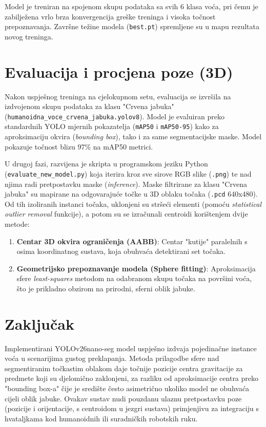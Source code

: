 \documentclass[12pt,a4paper]{article}
\begin{document}
Model je treniran na spojenom skupu podataka sa svih 6 klasa voća, pri čemu je zabilježena vrlo brza konvergencija greške treninga i visoka točnost prepoznavanja. Završne težine modela (\texttt{best.pt}) spremljene su u mapu rezultata novog treninga.

\section{Evaluacija i procjena poze (3D)}
Nakon uspješnog treninga na cjelokupnom setu, evaluacija se izvršila na izdvojenom skupu podataka za klasu "Crvena jabuka" (\texttt{humanoidna\_voce\_crvena\_jabuka.yolov8}).
Model je evaluiran preko standardnih YOLO mjernih pokazatelja (\texttt{mAP50} i \texttt{mAP50-95}) kako za aproksimaciju okvira (\textit{bounding box}), tako i za same segmentacijske maske. Model pokazuje točnost blizu 97\% na mAP50 metrici.

U drugoj fazi, razvijena je skripta u programskom jeziku Python (\texttt{evaluate\_new\_model.py}) koja iterira kroz sve sirove RGB slike (\texttt{.png}) te nad njima radi pretpostavku maske (\textit{inference}). Maske filtrirane za klasu "Crvena jabuka" su mapirane na odgovarajuće točke u 3D oblaku točaka (\texttt{.pcd} 640x480).
Od tih izoliranih instanci točaka, uklonjeni su stršeći elementi (pomoću \textit{statistical outlier removal} funkcije), a potom su se izračunali centroidi korištenjem dvije metode:
\begin{enumerate}
    \item \textbf{Centar 3D okvira ograničenja (AABB)}: Centar "kutije" paralelnih s osima koordinatnog sustava, koja obuhvaća detektirani set točaka.
    \item \textbf{Geometrijsko prepoznavanje modela (Sphere fitting)}: Aproksimacija sfere \textit{least-squares} metodom na odabranom skupu točaka na površini voća, što je prikladno obzirom na prirodni, sferni oblik jabuke.
\end{enumerate}

\section{Zaključak}
Implementirani YOLOv26nano-seg model uspješno izdvaja pojedinačne instance voća u scenarijima gustog preklapanja. Metoda prilagodbe sfere nad segmentiranim točkastim oblakom daje točnije pozicije centra gravitacije za predmete koji su djelomično zaklonjeni, za razliku od aproksimacije centra preko "bounding box-a" čije je središte često asimetrično ukoliko model ne obuhvaća cijeli oblik jabuke.
Ovakav sustav nudi pouzdanu ulaznu pretpostavku poze (pozicije i orijentacije, s centroidom u jezgri sustava) primjenjivu za integraciju s hvataljkama kod humanoidnih ili suradničkih robotskih ruku.
\end{document}
